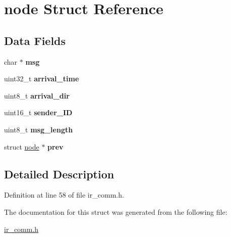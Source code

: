 \hypertarget{structnode}{\section{node Struct Reference}
\label{structnode}
}
\subsection*{Data Fields}
\begin{DoxyCompactItemize}
\item 
\hypertarget{structnode_aa22075b6b5ddd9f06c25acaa38d6eb1e}{char $\ast$ {\bfseries msg}}\label{structnode_aa22075b6b5ddd9f06c25acaa38d6eb1e}

\item 
\hypertarget{structnode_aa119b247b3261925f74d5fb10338df91}{uint32\+\_\+t {\bfseries arrival\+\_\+time}}\label{structnode_aa119b247b3261925f74d5fb10338df91}

\item 
\hypertarget{structnode_ad8e3492620e45459423ed064483aa2cb}{uint8\+\_\+t {\bfseries arrival\+\_\+dir}}\label{structnode_ad8e3492620e45459423ed064483aa2cb}

\item 
\hypertarget{structnode_aee4b2af06f06f92c6bbdbb4cd7ec9a68}{uint16\+\_\+t {\bfseries sender\+\_\+\+I\+D}}\label{structnode_aee4b2af06f06f92c6bbdbb4cd7ec9a68}

\item 
\hypertarget{structnode_a6ad68115b69ca2cdb58b06ca7c9bc4db}{uint8\+\_\+t {\bfseries msg\+\_\+length}}\label{structnode_a6ad68115b69ca2cdb58b06ca7c9bc4db}

\item 
\hypertarget{structnode_a7ee3d227c728ce18a86e43ebc301046e}{struct \hyperlink{structnode}{node} $\ast$ {\bfseries prev}}\label{structnode_a7ee3d227c728ce18a86e43ebc301046e}

\end{DoxyCompactItemize}


\subsection{Detailed Description}


Definition at line 58 of file ir\+\_\+comm.\+h.



The documentation for this struct was generated from the following file\+:\begin{DoxyCompactItemize}
\item 
\hyperlink{ir__comm_8h}{ir\+\_\+comm.\+h}\end{DoxyCompactItemize}
